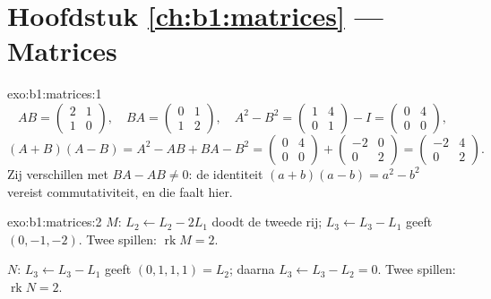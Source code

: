 \section*{Hoofdstuk \ref{ch:b1:matrices} --- Matrices}

\begin{solution}{exo:b1:matrices:1}
\[
AB = \begin{pmatrix} 2 & 1\\ 1 & 0\end{pmatrix},
\quad
BA = \begin{pmatrix} 0 & 1\\ 1 & 2\end{pmatrix},
\quad
A^2 - B^2 = \begin{pmatrix} 1 & 4\\ 0 & 1\end{pmatrix} - I
= \begin{pmatrix} 0 & 4\\ 0 & 0\end{pmatrix},
\]
\[
(A+B)(A-B) = A^2 - AB + BA - B^2
= \begin{pmatrix} 0 & 4\\ 0 & 0\end{pmatrix} +
\begin{pmatrix} -2 & 0\\ 0 & 2 \end{pmatrix}
= \begin{pmatrix} -2 & 4\\ 0 & 2\end{pmatrix}.
\]
Zij verschillen met $BA - AB \neq 0$: de identiteit $(a+b)(a-b) =
a^2 - b^2$ vereist commutativiteit, en die faalt hier.
\end{solution}

\begin{solution}{exo:b1:matrices:2}
$M$: $L_2 \leftarrow L_2 - 2L_1$ doodt de tweede rij; $L_3
\leftarrow L_3 - L_1$ geeft $(0, -1, -2)$. Twee spillen:
$\operatorname{rk} M = 2$.

$N$: $L_3 \leftarrow L_3 - L_1$ geeft $(0,1,1,1) = L_2$; daarna
$L_3 \leftarrow L_3 - L_2 = 0$. Twee spillen: $\operatorname{rk} N
= 2$.
\end{solution}

